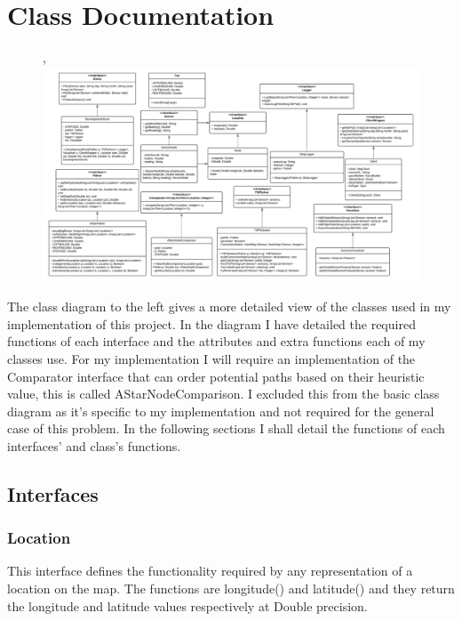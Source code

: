 \documentclass[12pt]{article}
\begin{document}
\section{Class Documentation}
\begin{figure}[28],
\includegraphics[width=1.15\textwidth, angle=90]{Detailed Class Diagrams.png}
\end{figure}
The class diagram to the left gives a more detailed view of the classes used in my implementation of this project. \newline
\newline
In the diagram I have detailed the required functions of each interface and the attributes and extra functions each of my classes use.\newline
\newline
For my implementation I will require an implementation of the Comparator interface that can order potential paths based on their heuristic value, this is called AStarNodeComparison. I excluded this from the basic class diagram as it's specific to my implementation and not required for the general case of this problem.\newline
\newline
In the following sections I shall detail the functions of each interfaces' and class's functions.
\newpage
\subsection{Interfaces}
\subsubsection{Location}
This interface defines the functionality required by any representation of a location on the map. The functions are longitude() and latitude() and they return the longitude and latitude values respectively at Double precision.
\end{document}
